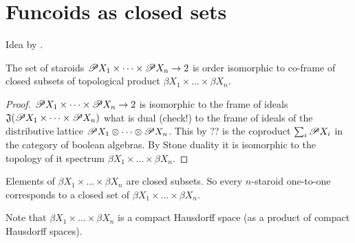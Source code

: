 \chapter{Funcoids as closed sets}

Idea \cite{nlab-topogeny} by .



\begin{thm}
The set of staroids
$\mathscr{P} X_1\times\dots\times\mathscr{P} X_n\to 2$ is
order isomorphic to co-frame of closed subsets of topological
product $\beta X_1\times\dots\times\beta X_n$.
\end{thm}

\begin{proof}
$\mathscr{P} X_1\times\dots\times\mathscr{P} X_n\to 2$ is isomorphic to
the frame of ideals
$\mathfrak{J}(\mathscr{P} X_1\times\dots\times\mathscr{P} X_n)$ what is
dual (check!) to the frame of ideals of the distributive lattice
$\mathscr{P} X_1\otimes\dots\otimes\mathscr{P} X_n$.
This by ?? is the coproduct $\sum_i \mathscr{P} X_i$ in the category
of boolean algebras.
By Stone duality it is isomorphic to the topology of it spectrum
$\beta X_1\times\dots\times\beta X_n$.
\end{proof}

Elements of $\beta X_1\times\dots\times\beta X_n$ are closed
subsets. So every $n$-staroid one-to-one corresponds to a closed
set of $\beta X_1\times\dots\times\beta X_n$.

Note that $\beta X_1\times\dots\times\beta X_n$ is a compact
Hausdorff space (as a product of compact Hausdorff spaces).


